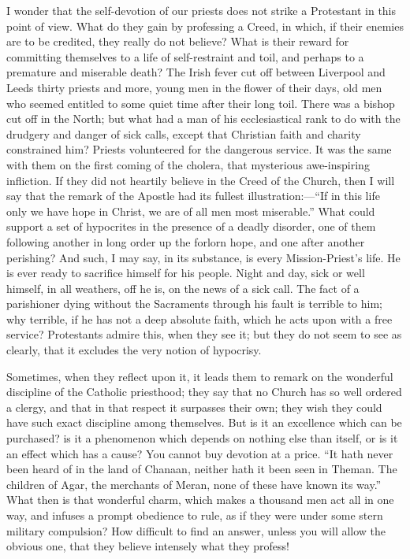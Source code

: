 I wonder that the self-devotion of our priests does not strike a
Protestant in this point of view. What do they gain by professing a
Creed, in which, if their enemies are to be credited, they
really do not believe? What is their reward for committing themselves to
a life of self-restraint and toil, and perhaps to a
premature and miserable death? The Irish fever cut off between Liverpool
and Leeds thirty priests and more, young men in the flower of their
days, old men who seemed entitled to some quiet time after their long
toil. There was a bishop cut off in the North; but what had a man of his
ecclesiastical rank to do with the drudgery and danger of sick calls,
except that Christian faith and charity constrained him? Priests
volunteered for the dangerous service. It was the same with them
on the first coming of the cholera, that mysterious awe-inspiring
infliction. If they did not heartily believe in the Creed
of the Church, then I will say that the remark of the Apostle had its
fullest illustration:—``If in this life only we have hope in
Christ, we are of all men most miserable.'' What could support a set
of hypocrites in the presence of a deadly disorder, one of them
following another in long order up the forlorn hope, and one after
another perishing? And such, I may say, in its substance, is every
Mission-Priest's life. He is ever ready to sacrifice himself for his
people. Night and day, sick or well himself, in all weathers, off he is,
on the news of a sick call. The fact of a parishioner dying without the
Sacraments through his fault is terrible to him; why terrible, if he has
not a deep absolute faith, which he acts upon with a free service?
Protestants admire this, when they see it; but they do not seem to see
as clearly, that it excludes the very notion of hypocrisy.

Sometimes, when they reflect upon it, it leads them to remark on the
wonderful discipline of the Catholic priesthood; they say that no Church
has so well ordered a clergy, and that in that respect it surpasses
their own; they wish they could have such exact discipline among themselves.
But is it an excellence which can be purchased? is it
a phenomenon which depends on nothing else than itself, or is it an
effect which has a cause? You cannot buy devotion at a price. ``It
hath never been heard of in the land of Chanaan, neither hath it been
seen in Theman. The children of Agar, the merchants of Meran, none of
these have known its way.'' What then is that wonderful charm, which
makes a thousand men act all in one way, and infuses a prompt obedience
to rule, as if they were under some stern military compulsion? How
difficult to find an answer, unless you will allow the obvious one, that
they believe intensely what they profess!

